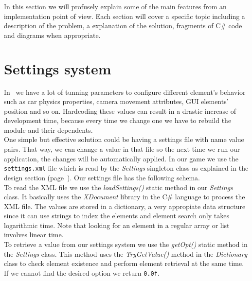 
In this section we will profusely explain some of the main features
from an implementation point of view. Each section will cover a specific
topic including a description of the problem, a explanation of the solution,
fragments of C\# code and diagrams when appropriate.

\section{Settings system}

In \game\ we have a lot of tunning parameters to configure different element's
behavior such as car physics properties, camera movement attributes, GUI
elements' position and so on. Hardcoding these values can result in a drastic
increase of development time, because every time we change one we have to
rebuild the module and their dependents.\\

One simple but effective solution could be having a settings file with
name value pairs. That way, we can change a value in that file so the next time
we run our application, the changes will be automatically applied. In our
game we use the \texttt{settings.xml} file which is read by the \textit{Settings}
singleton class as explained in the design section (page~\pageref{sec:design-system}).
Our settings file has the following schema.\\



To read the XML file we use the \textit{loadSettings()} static method in our
\textit{Settings} class. It basically uses the \textit{XDocument} library
in the C\# language to process the XML file. The values are stored in a dictionary,
a very appropiate data structure since it can use strings to index the elements
and element search only takes logarithmic time. Note that looking for an element
in a regular array or list involves linear time.\\



To retrieve a value from our settings system we use the \textit{getOpt()} static
method in the \textit{Settings} class. This method uses the \textit{TryGetValue()}
method in the \textit{Dictionary} class to check element existence and perform
element retrieval at the same time. If we cannot find the desired option
we return \texttt{0.0f}.\\

